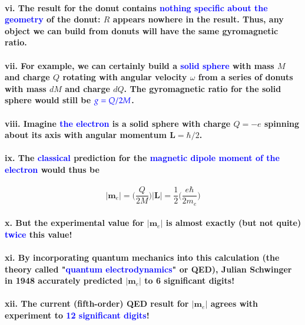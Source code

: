 \documentclass{article}
\begin{document}
\paragraph{\indent\indent vi. The result for the donut contains \textcolor{blue}{nothing specific about the geometry} of the donut: $R$ appears nowhere in the result. Thus, any object we can build from donuts will have the same gyromagnetic ratio.}
\paragraph{\indent\indent vii. For example, we can certainly build a \textcolor{blue}{solid sphere} with mass $M$ and charge $Q$ rotating with angular velocity $\omega$ from a series of donuts with mass $dM$ and charge $dQ$. The gyromagnetic ratio for the solid sphere would still be $\textcolor{blue}{g=Q/2M}$.}
\paragraph{\indent\indent viii. Imagine \textcolor{blue}{the electron} is a solid sphere with charge $Q=-e$ spinning about its axis with angular momentum $\boldsymbol{L}=\hbar/2$.}
\paragraph{\indent\indent ix. The \textcolor{blue}{classical} prediction for the \textcolor{blue}{magnetic dipole moment of the electron} would thus be}
\begin{equation*}
    |\boldsymbol{m}_e|=\bigg(\frac{Q}{2M}\bigg)|\boldsymbol{L}|=\frac{1}{2}\bigg(\frac{e\hbar}{2m_e}\bigg)
\end{equation*}
\paragraph{\indent\indent x. But the experimental value for $|\boldsymbol{m}_e|$ is almost exactly (but not quite) \textcolor{blue}{twice} this value!}
\paragraph{\indent\indent xi. By incorporating quantum mechanics into this calculation (the theory called "\textcolor{blue}{quantum electrodynamics}" or QED), Julian Schwinger in 1948 accurately predicted $|\boldsymbol{m}_e|$ to 6 significant digits!}
\paragraph{\indent\indent xii. The current (fifth-order) QED result for $|\boldsymbol{m}_e|$ agrees with experiment to \textcolor{blue}{12 significant digits}!}
\end{document}
